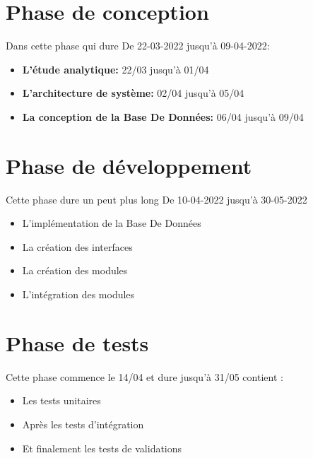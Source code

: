 \documentclass[11pt,fleqn]{book} %
\begin{document}
\section{Phase de conception}
Dans cette phase qui dure De 22-03-2022 jusqu’à 09-04-2022:
\begin{itemize}
    \item \textbf{L’étude analytique: } 22/03 jusqu'à 01/04
    \item \textbf{L’architecture de système: } 02/04 jusqu'à 05/04
    \item \textbf{La conception de la Base De Données: } 06/04 jusqu'à 09/04
\end{itemize}


\section{Phase de développement}
Cette phase dure un peut plus long De 10-04-2022 jusqu’à 30-05-2022
\begin{itemize}
    \item  L’implémentation de la Base De Données
    \item La création des interfaces
    \item La création des modules 
    \item  L’intégration des modules 
\end{itemize}


\section{Phase de tests}
Cette phase commence le 14/04 et dure jusqu'à 31/05 contient :
\begin{itemize}
    \item  Les tests unitaires
    \item Après les tests d’intégration
    \item  Et finalement les tests de validations
\end{itemize}
\end{document}

